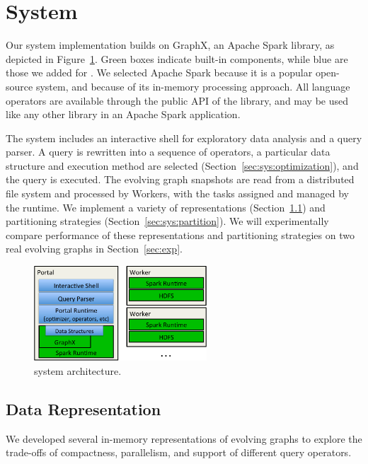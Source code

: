 \section{System}
\label{sec:sys}

Our \ql system implementation builds on GraphX, an Apache Spark
library, as depicted in Figure~\ref{fig:arch}.  Green boxes indicate
built-in components, while blue are those we added for \ql.  We
selected Apache Spark because it is a popular open-source system, and
because of its in-memory processing approach.  All language operators
are available through the public API of the \ql library, and may be
used like any other library in an Apache Spark application.

The \ql system includes an interactive shell for exploratory data
analysis and a query parser.  A \ql query is rewritten into a sequence
of operators, a particular data structure and execution method are
selected (Section~\ref{sec:sys:optimization}), and the query is
executed.  The evolving graph snapshots are read from a distributed
file system and processed by Workers, with the tasks assigned and
managed by the runtime.  We implement a variety of \tg representations
(Section~\ref{sec:sys:datastructs}) and partitioning strategies
(Section~\ref{sec:sys:partition}).  We will experimentally compare
performance of these representations and partitioning strategies on
two real evolving graphs in Section~\ref{sec:exp}.

\begin{figure}[t!]
\begin{center}
\includegraphics[height=1.4in]{figs/architecture.pdf}
\caption{\ql system architecture.}
\label{fig:arch}
\end{center}
\vspace{-0.5cm}
\end{figure}

\subsection{Data Representation}
\label{sec:sys:datastructs}

We developed several in-memory representations of evolving graphs to
explore the trade-offs of compactness, parallelism, and support of
different query operators. 

